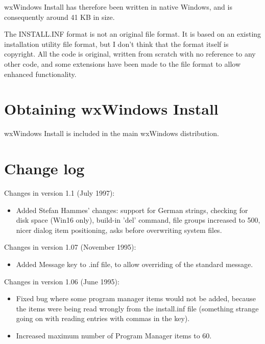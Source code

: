 wxWindows Install has therefore been written in native Windows,
and is consequently around 41 KB in size.

The INSTALL.INF format is not an original file format. It is
based on an existing installation utility file format, but
I don't think that the format itself is copyright. All the
code is original, written from scratch with no reference
to any other code, and some extensions have been made to
the file format to allow enhanced functionality.


\chapter{Obtaining wxWindows Install}

wxWindows Install is included in the main wxWindows distribution.

\chapter{Change log}

Changes in version 1.1 (July 1997):

\begin{itemize}\itemsep=0pt
\item Added Stefan Hammes' changes: support for German strings, checking
for disk space (Win16 only), build-in 'del' command, file groups increased
to 500, nicer dialog item positioning, asks before overwriting system files.
\end{itemize}

Changes in version 1.07 (November 1995):

\begin{itemize}\itemsep=0pt
\item Added Message key to .inf file, to allow overriding of the standard message.
\end{itemize}

Changes in version 1.06 (June 1995):

\begin{itemize}
\item Fixed bug where some program manager items would not be
added, because the items were being read wrongly from the install.inf file
(something strange going on with reading entries with commas in the key).
\item Increased maximum number of Program Manager items to 60.
\end{itemize}

